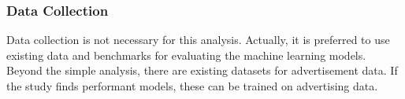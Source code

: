 \subsubsection{Data Collection}

Data collection is not necessary for this analysis.  Actually, it is preferred to use existing data and benchmarks for evaluating the machine learning models.  Beyond the simple analysis, there are existing datasets for advertisement data.  If the study finds performant models, these can be trained on advertising data.  

